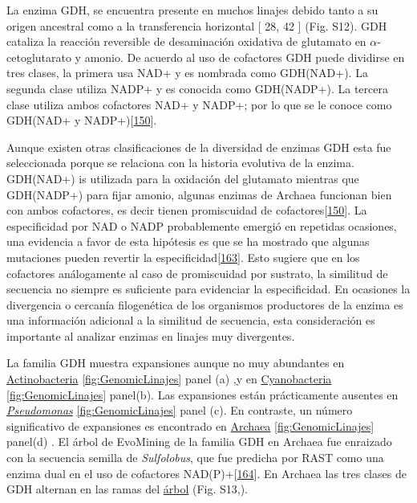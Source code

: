 \documentclass[12pt,twoside]{reedthesis}
\begin{document}
  La enzima GDH, se encuentra presente en muchos linajes debido tanto a su
  origen ancestral como a la transferencia horizontal {[} 28, 42 {]} (Fig.
  S12). GDH cataliza la reacción reversible de desaminación oxidativa de
  glutamato en \(\alpha\)-cetoglutarato y amonio. De acuerdo al uso de
  cofactores GDH puede dividirse en tres clases, la primera usa NAD+ y es
  nombrada como GDH(NAD+). La segunda clase utiliza NADP+ y es conocida
  como GDH(NADP+). La tercera clase utiliza ambos cofactores NAD+ y NADP+;
  por lo que se le conoce como GDH(NAD+ y
  NADP+){[}\protect\hyperlink{ref-engel_glutamate_2014}{150}{]}.
  
  Aunque existen otras clasificaciones de la diversidad de enzimas GDH
  esta fue seleccionada porque se relaciona con la historia evolutiva de
  la enzima. GDH(NAD+) is utilizada para la oxidación del glutamato
  mientras que GDH(NADP+) para fijar amonio, algunas enzimas de Archaea
  funcionan bien con ambos cofactores, es decir tienen promiscuidad de
  cofactores{[}\protect\hyperlink{ref-engel_glutamate_2014}{150}{]}. La
  especificidad por NAD o NADP probablemente emergió en repetidas
  ocasiones, una evidencia a favor de esta hipótesis es que se ha mostrado
  que algunas mutaciones pueden revertir la
  especificidad{[}\protect\hyperlink{ref-lilley_partial_1991}{163}{]}.
  Esto sugiere que en los cofactores análogamente al caso de promiscuidad
  por sustrato, la similitud de secuencia no siempre es suficiente para
  evidenciar la especificidad. En ocasiones la divergencia o cercanía
  filogenética de los organismos productores de la enzima es una
  información adicional a la similitud de secuencia, esta consideración es
  importante al analizar enzimas en linajes muy divergentes.
  
  La familia GDH muestra expansiones aunque no muy abundantes en
  \href{https://microreact.org/project/r1IhjVm6X?tt=cr}{Actinobacteria}
  \autoref{fig:GenomicLinajes} panel (a) ,y en
  \href{https://microreact.org/project/HyjYUN7pQ?tt=cr}{Cyanobacteria}
  \autoref{fig:GenomicLinajes} panel(b). Las expansiones están
  prácticamente ausentes en
  \href{https://microreact.org/project/HyjYUN7pQ?tt=cr}{\emph{Pseudomonas}}
  \autoref{fig:GenomicLinajes} panel (c). En contraste, un número
  significativo de expansiones es encontrado en
  \href{https://microreact.org/project/ByUcvNmaX?tt=cr}{Archaea}
  \autoref{fig:GenomicLinajes} panel(d) . El árbol de EvoMining de la
  familia GDH en Archaea fue enraizado con la secuencia semilla de
  \emph{Sulfolobus}, que fue predicha por RAST como una enzima dual en el
  uso de cofactores
  NAD(P)+{[}\protect\hyperlink{ref-consalvi_glutamate_1991}{164}{]}. En
  Archaea las tres clases de GDH alternan en las ramas del
  \href{https://microreact.org/project/ByUcvNmaX?tt=cr}{árbol} (Fig.
  S13,).
  
\end{document}

